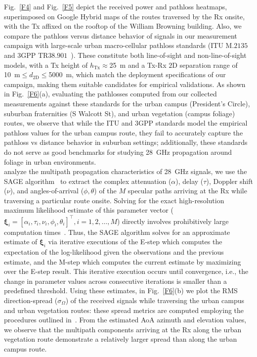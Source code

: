 \documentclass[10pt, twocolumn]{IEEEtran}
\begin{document}
Fig.~\ref{F4} and Fig.~\ref{F5} depict the received power and pathloss heatmaps, superimposed on Google Hybrid maps of the routes traversed by the Rx onsite, with the Tx affixed on the rooftop of the William Browning building. Also, we compare the pathloss versus distance behavior of signals in our measurement campaign with large-scale urban macro-cellular pathloss standards (ITU M$.2135$ and $3$GPP TR$38.901$~\cite{MacCartneyModelsOverview}). These constitute both line-of-sight and non-line-of-sight models, with a Tx height of $h_{\text{Tx}}{\approx}$\SI{25}{\meter} and a Tx-Rx $2$D separation range of \SI{10}{\meter}${\leq}d_{2\text{D}}{\leq}$\SI{5000}{\meter}, which match the deployment specifications of our campaign, making them suitable candidates for empirical validations. As shown in Fig.~\ref{F6}(a), evaluating the pathlosses computed from our collected measurements against these standards for the urban campus (President's Circle), suburban fraternities (S Walcott St), and urban vegetation (campus foliage) routes, we observe that while the ITU and $3$GPP standards model the empirical pathloss values for the urban campus route, they fail to accurately capture the pathloss vs distance behavior in suburban settings; additionally, these standards do not serve as good benchmarks for studying \SI{28}{\giga\hertz} propagation around foliage in urban environments.\\
 analyze the multipath propagation characteristics of \SI{28}{\giga\hertz} signals, we use the SAGE algorithm~\cite{SAGE} to extract the complex attenuation ($\alpha$), delay ($\tau$), Doppler shift ($\nu$), and angles-of-arrival ($\phi,\theta$) of the $M$ specular paths arriving at the Rx while traversing a particular route onsite. Solving for the exact high-resolution maximum likelihood estimate of this parameter vector ($\bm{\xi}_{i}{=}[\alpha_{i},\tau_{i},\nu_{i},\phi_{i},\theta_{i}]^{\intercal},i{=}1,2,{\dots},M$) directly involves prohibitively large computation times~\cite{SAGE}. Thus, the SAGE algorithm solves for an approximate estimate of $\bm{\xi}_{i}$ via iterative executions of the E-step which computes the expectation of the log-likelihood given the observations and the previous estimate, and the M-step which computes the current estimate by maximizing over the E-step result. This iterative execution occurs until convergence, i.e., the change in parameter values across consecutive iterations is smaller than a predefined threshold. Using these estimates, in Fig.~\ref{F6}(b) we plot the RMS direction-spread ($\sigma_{\Omega}$) of the received signals while traversing the urban campus and urban vegetation routes: these spread metrics are computed employing the procedures outlined in~\cite{Indoor60G}. From the estimated AoA azimuth and elevation values, we observe that the multipath components arriving at the Rx along the urban vegetation route demonstrate a relatively larger spread than along the urban campus route.\\
\end{document}
